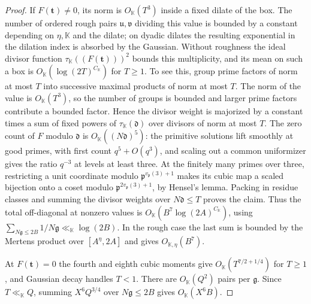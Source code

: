 \documentclass[11pt,letterpaper]{article}
\theoremstyle{definition}
\numberwithin{equation}{section}
\begin{document}
\begin{proof}
If $F(\mathbf t)\ne0$, its norm is $O_{\mathbb K}(T^3)$ inside a
fixed dilate of the box. The number of ordered rough pairs
$\mathfrak u,\mathfrak v$ dividing this value is bounded by a
constant depending on $\eta,\mathbb K$ and the dilate; on dyadic
dilates the resulting exponential in the dilation index is absorbed
by the Gaussian. Without roughness the ideal divisor function
$\tau_{\mathbb K}((F(\mathbf t)))^2$ bounds this multiplicity, and
its mean on such a box is $O_{\mathbb K}(\log(2T)^{C_{\mathbb K}})$
for $T\ge1$. To see this, group prime factors of norm at most $T$
into successive maximal products of norm at most $T$. The norm of
the value is $O_{\mathbb K}(T^3)$, so the number of groups is
bounded and larger prime factors contribute a bounded factor.
Hence the divisor weight is majorized by a constant times a sum
of fixed powers of $\tau_{\mathbb K}(\mathfrak d)$ over divisors
of norm at most $T$. The zero count of $F$ modulo
$\mathfrak d$ is $O_{\mathbb K}((N\mathfrak d)^5)$: the primitive
solutions lift smoothly at good primes, with first count
$q^5+O(q^3)$, and scaling out a common uniformizer gives the ratio
$q^{-3}$ at levels at least three. At the finitely many primes
over three, restricting a unit coordinate modulo
$\mathfrak p^{v_{\mathfrak p}(3)+1}$ makes its cubic map a scaled
bijection onto a coset modulo
$\mathfrak p^{2v_{\mathfrak p}(3)+1}$, by Hensel's lemma.
Packing in residue classes and summing the divisor weights over
$N\mathfrak d\le T$ proves the claim. Thus the total off-diagonal
at nonzero values is $O_{\mathbb K}(B^7\log(2A)^{C_{\mathbb K}})$,
using $\sum_{N\mathfrak g\le2B}1/N\mathfrak g\ll_{\mathbb K}\log(2B)$.
In the rough case the last sum is bounded by the Mertens product
over $[A^\eta,2A]$ and gives $O_{\mathbb K,\eta}(B^7)$.

At $F(\mathbf t)=0$ the fourth and eighth cubic moments
\cite{nf3:kalinka} give $O_{\mathbb K}(T^{7/2+1/4})$ for $T\ge1$,
and Gaussian decay handles $T<1$. There are $O_{\mathbb K}(Q^2)$
pairs per $\mathfrak g$. Since $T\ll_{\mathbb K}Q$, summing
$X^6Q^{3/4}$ over $N\mathfrak g\le2B$ gives $O_{\mathbb K}(X^6B)$.


\end{proof}
\end{document}
